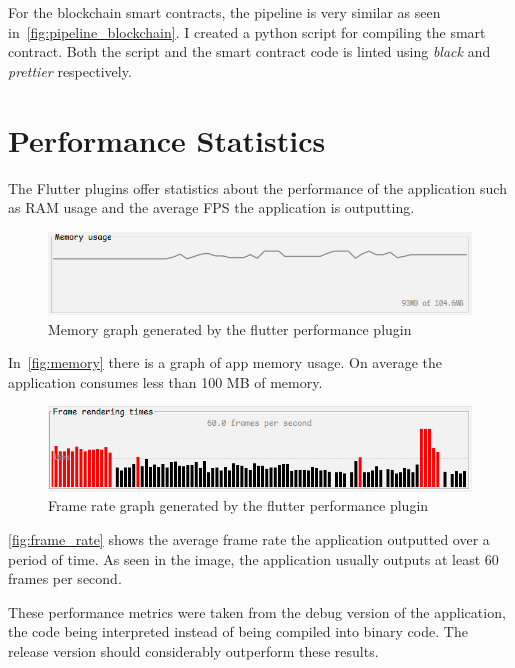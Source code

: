 \documentclass[a4paper,12pt]{report}
\begin{document}
For the blockchain smart contracts, the pipeline is very similar as seen
in~\autoref{fig:pipeline_blockchain}. I created a python script for compiling
the smart contract. Both the script and the smart contract code is linted using
\textit{black} and \textit{prettier} respectively.

\section{Performance Statistics}

The Flutter plugins offer statistics about the performance of the application
such as RAM usage and the average FPS the application is outputting.

\begin{figure}[H]
    \centering
    \includegraphics[scale=0.7]{images/app/memory.png}
    \caption{Memory graph generated by the flutter performance plugin}\label{fig:memory}
\end{figure}

In~\autoref{fig:memory} there is a graph of app memory usage. On average the
application consumes less than 100 MB of memory.

\begin{figure}[H]
    \centering
    \includegraphics[scale=0.7]{images/app/frame_rate.png}
    \caption{Frame rate graph generated by the flutter performance plugin}\label{fig:frame_rate}
\end{figure}

\autoref{fig:frame_rate} shows the average frame rate the application outputted
over a period of time. As seen in the image, the application usually outputs at
least 60 frames per second.

These performance metrics were taken from the debug version of the application,
the code being interpreted instead of being compiled into binary code. The
release version should considerably outperform these results.
\end{document}
